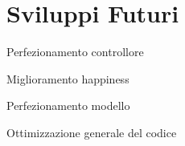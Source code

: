 \section{Sviluppi Futuri}
Perfezionamento controllore

Miglioramento happiness

Perfezionamento modello

Ottimizzazione generale del codice

